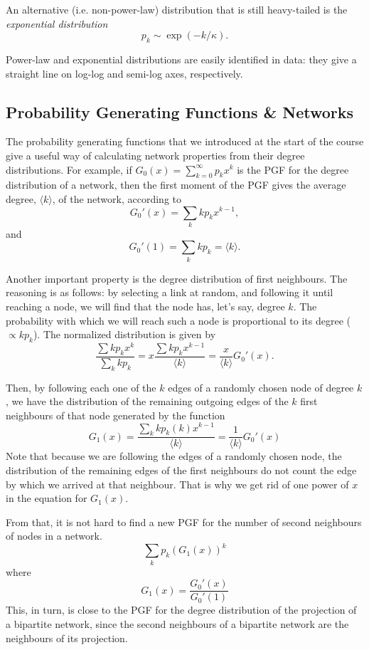 An alternative (i.e. non-power-law) distribution that is still heavy-tailed is the \emph{exponential distribution}
$$
	p_k\sim\exp(-k/\kappa).
$$

Power-law and exponential distributions are easily identified in data: they give a straight line on log-log and semi-log axes, respectively.

\subsection{Probability Generating Functions \& Networks}
The probability generating functions that we introduced at the start of the course give a useful way of calculating network properties from their degree distributions. For example, if $G_0(x) = \sum_{k=0}^\infty p_kx^k$ is the PGF for the degree distribution of a network, then the first moment of the PGF gives the average degree, $\langle k \rangle$, of the network, according to
$$
	G_{0}'(x) = \sum_{k}kp_{k}x^{k-1},
$$
and
$$
	G_{0}'(1) = \sum_{k}kp_{k} = \langle k \rangle.
$$	

Another important property is the degree distribution of first neighbours. The reasoning is as follows: by selecting a link at random, and following it until reaching a node, we will find that the node has, let's say, degree $k$. The probability with which we will reach such a node is proportional to its degree ($\propto kp_{k}$). The normalized distribution is given by
$$
	\dfrac{\sum kp_{k}x^{k}}{\sum_{k}kp_{k}} = x \dfrac{\sum kp_{k}x^{k-1}}{\langle k \rangle} = \dfrac{x}{\langle k \rangle}G_{0}'(x).
$$

Then, by following each one of the $k$ edges of a randomly chosen node of degree $k$, we have the distribution of the remaining outgoing edges of the $k$ first neighbours of that node generated by the function 
$$
	G_{1}(x) = \dfrac{\sum_{k}kp_{k}(k)x^{k-1}}{\langle k \rangle} = \dfrac{1}{\langle k \rangle}G_{0}'(x)
$$
Note that because we are following the edges of a randomly chosen node, the distribution of the remaining edges of the first neighbours do not count the edge by which we arrived at that neighbour. That is why we get rid of one power of $x$ in the equation for $G_{1}(x)$.

From that, it is not hard to find a new PGF for the number of second neighbours of nodes in a network. 
$$\sum_k p_k (G_1(x))^k $$ 
where 
$$G_1(x) = \frac{G_{0}'(x)}{G_{0}'(1)}$$ 
This, in turn, is close to the PGF for the degree distribution of the projection of a bipartite network, since the second neighbours of a bipartite network are the neighbours of its projection.


